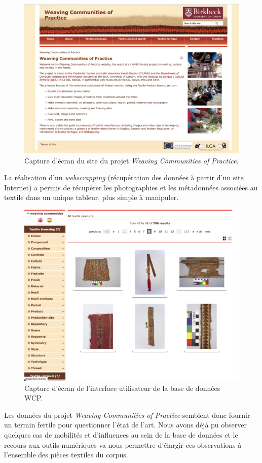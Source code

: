 \begin{figure}[!ht]
       \begin{center}
        		\includegraphics[width=12cm]{../images/screenWCP.png}
		\caption{Capture d'écran du site du projet \textit{Weaving Communities of Practice}.}
	\label{fig:WCP}
	\end{center}
\end{figure}

La réalisation d'un \textit{webscrapping} (récupération des données à partir d'un site Internet) a permis de récupérer les photographies et les métadonnées associées au textile dans un unique tableur, plus simple à manipuler.\\

\begin{figure}[!ht]
       \begin{center}
        		\includegraphics[width=12cm]{../images/screenWCPSearch.png}
		\caption{Capture d'écran de l'interface utilisateur de la base de données WCP.}
	\label{fig:WCPSearch}
	\end{center}
\end{figure}

Les données du projet \textit{Weaving Communities of Practice} semblent donc fournir un terrain fertile pour questionner l'état de l'art. Nous avons déjà pu observer quelques cas de mobilités et d'influences au sein de la base de données et le recours aux outils numériques va nous permettre d'élargir ces observations à l'ensemble des pièces textiles du corpus. 

